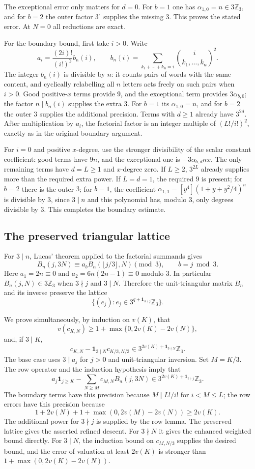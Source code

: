\documentclass[11pt,a4paper]{article}
\theoremstyle{definition}\newtheorem{definition}[theorem]{Definition}
\theoremstyle{remark}\newtheorem{remark}[theorem]{Remark}
\numberwithin{equation}{section}
\begin{document}
The exceptional error only matters for $d=0$. For $b=1$ one has
$\alpha_{1,0}=n\in3\mathbb Z_3$, and for $b=2$ the outer factor
$3^\epsilon$ supplies the missing $3$. This proves the stated error.
At $N=0$ all reductions are exact.

For the boundary bound, first take $i>0$. Write
\[
 a_i=\frac{(2i)!}{(i!)^2}b_n(i),\qquad
 b_n(i)=\sum_{k_1+\cdots+k_n=i}\binom{i}{k_1,\ldots,k_n}^2.
\]
The integer $b_n(i)$ is divisible by $n$: it counts pairs of words
with the same content, and cyclically relabelling all $n$ letters acts
freely on such pairs when $i>0$.
Good positive-$x$ terms provide $9$, and the exceptional term provides
$3\alpha_{b,0}$; the factor $n\mid b_n(i)$ supplies the extra $3$.
For $b=1$ its $\alpha_{1,0}=n$, and for $b=2$ the outer $3$ supplies
the additional precision. Terms with $d\ge1$ already have $3^{2d}$.
After multiplication by $a_i$, the factorial factor is an integer
multiple of $(L!/i!)^2$, exactly as in the original boundary argument.

For $i=0$ and positive $x$-degree, use the stronger divisibility of the
scalar constant coefficient: good terms have $9n$, and the exceptional
one is $-3\alpha_{b,d}nx$.
The only remaining terms have $d=L\ge1$ and $x$-degree zero. If $L\ge2$,
$3^{2L}$ already supplies more than the required extra power. If
$L=d=1$, the required $9$ is present; for $b=2$ there is the outer $3$;
for $b=1$, the coefficient
$\alpha_{1,1}=[y^4](1+y+y^2/4)^n$ is divisible by $3$, since $3\mid n$
and this polynomial has, modulo $3$, only degrees divisible by $3$.
This completes the boundary estimate.

\subsection{The preserved triangular lattice}
For $3\mid n$, Lucas' theorem applied to the factorial summands gives
\[
 B_n(j,3N)\equiv a_b B_n(\lfloor j/3\rfloor,N)\pmod3,
 \qquad b=j\bmod3.
\]
Here $a_1=2n\equiv0$ and $a_2=6n(2n-1)\equiv0$ modulo $3$.
In particular $B_n(j,N)\in3\mathbb Z_3$ when $3\nmid j$ and $3\mid N$.
Therefore the unit-triangular matrix $B_n$ and its inverse preserve
the lattice
\[
 \{(e_j):e_j\in3^{q+\mathbf1_{3\nmid j}}\mathbb Z_3\}.
\]

We prove simultaneously, by induction on $v(K)$, that
\[
 v(c_{K,N})\ge1+\max\{0,2v(K)-2v(N)\},
\]
and, if $3\mid K$,
\[
 c_{K,N}-\mathbf1_{3\mid N}c_{K/3,N/3}
 \in3^{2v(K)+\mathbf1_{3\nmid N}}\mathbb Z_3.
\]
The base case uses $3\mid a_j$ for $j>0$ and unit-triangular inversion.
Set $M=K/3$. The row operator and the induction hypothesis imply that
\[
 a_j\mathbf1_{j\ge K}-\sum_{N\ge M}c_{M,N}B_n(j,3N)
 \in3^{2v(K)+\mathbf1_{3\nmid j}}\mathbb Z_3.
\]
The boundary terms have this precision because $M\mid L!/i!$ for
$i<M\le L$; the row errors have this precision because
\[
 1+2v(N)+1+\max(0,2v(M)-2v(N))\ge2v(K).
\]
The additional power for $3\nmid j$ is supplied by the row lemma.
The preserved lattice gives the asserted refined descent.
For $3\nmid N$ it gives the enhanced weighted bound directly. For
$3\mid N$, the induction bound on $c_{M,N/3}$ supplies the desired
bound, and the error of valuation at least $2v(K)$ is stronger than
$1+\max(0,2v(K)-2v(N))$.
\end{document}
